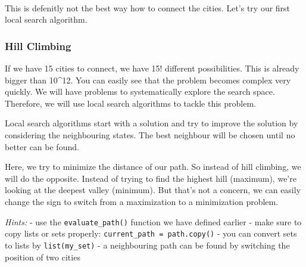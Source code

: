 \documentclass[11pt]{article}
\begin{document}
    \begin{center}
    \end{center}
    { \hspace*{\fill} \\}
    
    This is defenitly not the best way how to connect the cities. Let's try
our first local search algorithm.

    \hypertarget{hill-climbing}{%
\subsubsection{Hill Climbing}\label{hill-climbing}}

If we have 15 cities to connect, we have 15! different possibilities.
This is already bigger than 10\^{}12. You can easily see that the
problem becomes complex very quickly. We will have problems to
systematically explore the search space. Therefore, we will use local
search algorithms to tackle this problem.

Local search algorithms start with a solution and try to improve the
solution by considering the neighbouring states. The best neighbour will
be chosen until no better can be found.

Here, we try to minimize the distance of our path. So instead of hill
climbing, we will do the opposite. Instead of trying to find the highest
hill (maximum), we're looking at the deepest valley (minimum). But
that's not a concern, we can easily change the sign to switch from a
maximization to a minimization problem.

\emph{Hints:} - use the \texttt{evaluate\_path()} function we have
defined earlier - make sure to copy lists or sets properly:
\texttt{current\_path\ =\ path.copy()} - you can convert sets to lists
by \texttt{list(my\_set)} - a neighbouring path can be found by
switching the position of two cities
\end{document}
